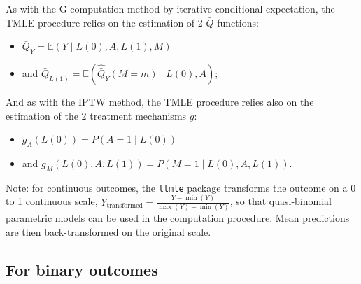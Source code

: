 \documentclass[
]{book}
\providecommand{\tightlist}{%
  \setlength{\itemsep}{0pt}\setlength{\parskip}{0pt}}
\begin{document}
As with the G-computation method by iterative conditional expectation, the TMLE procedure relies on the estimation of 2 \(\bar{Q}\) functions:

\begin{itemize}
\tightlist
\item
  \(\bar{Q}_Y = \mathbb{E}(Y \mid L(0),A,L(1),M)\)
\item
  and \(\bar{Q}_{L(1)} = \mathbb{E}(\hat{\bar{Q}}_Y(M=m) \mid L(0),A)\);
\end{itemize}

And as with the IPTW method, the TMLE procedure relies also on the estimation of the 2 treatment mechanisms \(g\):

\begin{itemize}
\tightlist
\item
  \(g_A(L(0)) = P(A=1 \mid L(0))\)
\item
  and \(g_M(L(0),A,L(1)) = P(M=1 \mid L(0),A,L(1))\).
\end{itemize}

Note: for continuous outcomes, the \texttt{ltmle} package transforms the outcome on a 0 to 1 continuous scale, \(Y_\text{transformed} = \frac{Y - \min(Y)}{\max(Y) - \min(Y)}\), so that quasi-binomial parametric models can be used in the computation procedure. Mean predictions are then back-transformed on the original scale.

\subsection{For binary outcomes}\label{for-binary-outcomes}
\end{document}
